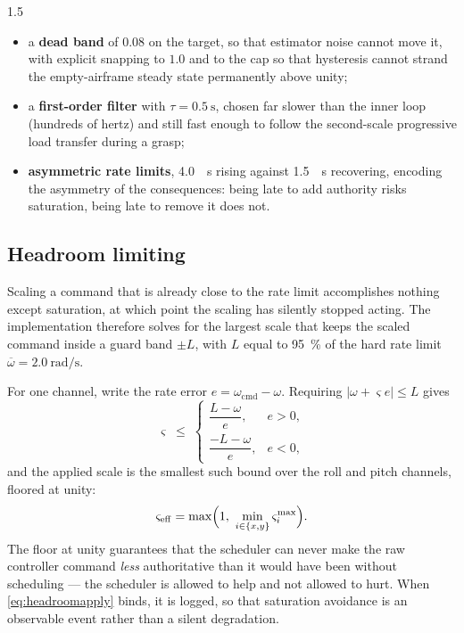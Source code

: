 \begin{spacing}{1.5}
\begin{itemize}
\item a \textbf{dead band} of $0.08$ on the target, so that estimator noise
cannot move it, with explicit snapping to $1.0$ and to the cap so that hysteresis
cannot strand the empty-airframe steady state permanently above unity;
\item a \textbf{first-order filter} with $\tau=\SI{0.5}{\second}$, chosen far
slower than the inner loop (hundreds of hertz) and still fast enough to follow the
second-scale progressive load transfer during a grasp;
\item \textbf{asymmetric rate limits}, \SI{4.0}{\per\second} rising against
\SI{1.5}{\per\second} recovering, encoding the asymmetry of the consequences:
being late to add authority risks saturation, being late to remove it does not.
\end{itemize}

\subsection{Headroom limiting}\label{sec:frame:headroom}

Scaling a command that is already close to the rate limit accomplishes nothing
except saturation, at which point the scaling has silently stopped acting. The
implementation therefore solves for the largest scale that keeps the scaled
command inside a guard band $\pm L$, with $L$ equal to \SI{95}{\percent} of the
hard rate limit $\overline{\omega}=\SI{2.0}{\radian\per\second}$.

For one channel, write the rate error $e=\omega_{\mathrm{cmd}}-\omega$. Requiring
$|\omega+\varsigma e|\le L$ gives
\begin{equation}
\varsigma \;\le\;
\begin{cases}
\dfrac{L-\omega}{e}, & e>0,\\[8pt]
\dfrac{-L-\omega}{e}, & e<0,
\end{cases}
\label{eq:headroom}
\end{equation}
and the applied scale is the smallest such bound over the roll and pitch
channels, floored at unity:
\begin{equation}
\varsigma_{\mathrm{eff}} = \max\Bigl(1,\ \min_{i\in\{x,y\}} \varsigma_i^{\max}\Bigr).
\label{eq:headroomapply}
\end{equation}
The floor at unity guarantees that the scheduler can never make the raw
controller command \emph{less} authoritative than it would have been without
scheduling --- the scheduler is allowed to help and not allowed to hurt. When
\eqref{eq:headroomapply} binds, it is logged, so that saturation avoidance is an
observable event rather than a silent degradation.


\end{spacing}
